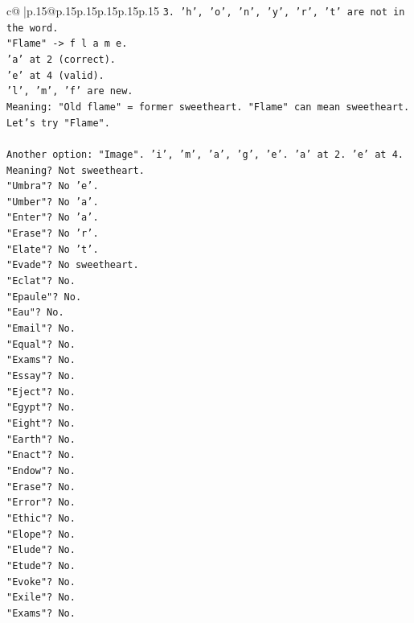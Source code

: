 \documentclass{article}
\begin{document}
{\begin{supertabular}{c@{$\;$}|p{.15\linewidth}@{}p{.15\linewidth}p{.15\linewidth}p{.15\linewidth}p{.15\linewidth}p{.15\linewidth}}
{{{\texttt{3. 'h', 'o', 'n', 'y', 'r', 't' are not in the word.} \\
\texttt{"Flame" {-}> f l a m e.} \\
\texttt{'a' at 2 (correct).} \\
\texttt{'e' at 4 (valid).} \\
\texttt{'l', 'm', 'f' are new.} \\
\texttt{Meaning: "Old flame" = former sweetheart. "Flame" can mean sweetheart.} \\
\texttt{Let's try "Flame".} \\
\\ 
\texttt{Another option: "Image". 'i', 'm', 'a', 'g', 'e'. 'a' at 2. 'e' at 4. Meaning? Not sweetheart.} \\
\texttt{"Umbra"? No 'e'.} \\
\texttt{"Umber"? No 'a'.} \\
\texttt{"Enter"? No 'a'.} \\
\texttt{"Erase"? No 'r'.} \\
\texttt{"Elate"? No 't'.} \\
\texttt{"Evade"? No sweetheart.} \\
\texttt{"Eclat"? No.} \\
\texttt{"Epaule"? No.} \\
\texttt{"Eau"? No.} \\
\texttt{"Email"? No.} \\
\texttt{"Equal"? No.} \\
\texttt{"Exams"? No.} \\
\texttt{"Essay"? No.} \\
\texttt{"Eject"? No.} \\
\texttt{"Egypt"? No.} \\
\texttt{"Eight"? No.} \\
\texttt{"Earth"? No.} \\
\texttt{"Enact"? No.} \\
\texttt{"Endow"? No.} \\
\texttt{"Erase"? No.} \\
\texttt{"Error"? No.} \\
\texttt{"Ethic"? No.} \\
\texttt{"Elope"? No.} \\
\texttt{"Elude"? No.} \\
\texttt{"Etude"? No.} \\
\texttt{"Evoke"? No.} \\
\texttt{"Exile"? No.} \\
\texttt{"Exams"? No.} \\
}}}
\end{supertabular}}
\end{document}
